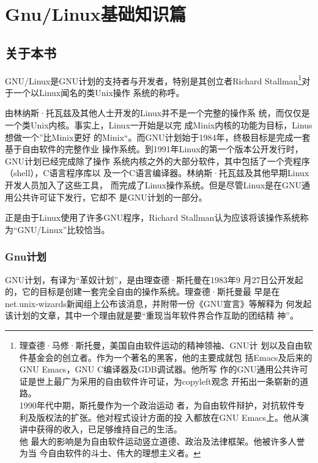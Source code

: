\part{Gnu/Linux基础知识篇}
\label{part1}

\chapter{关于本书}
\label{part1:chap1}

GNU/Linux是GNU计划的支持者与开发者，特别是其创立者Richard
Stallman\footnote{理查德·马修·斯托曼，美国自由软件运动的精神领袖、GNU计
  划以及自由软件基金会的创立者。作为一个著名的黑客，他的主要成就包
  括Emacs及后来的GNU Emacs，GNU C编译器及GDB调试器。他所写
  作的GNU通用公共许可证是世上最广为采用的自由软件许可证，为copyleft观念
  开拓出一条崭新的道路。\\ \indent1990年代中期，斯托曼作为一个政治运动
  者，为自由软件辩护，对抗软件专利及版权法的扩张。他对程式设计方面的投
  入都放在GNU Emacs上。他从演讲中获得的收入，已足够维持自己的生活。\\他
  最大的影响是为自由软件运动竖立道德、政治及法律框架。他被许多人誉为当
  今自由软件的斗士、伟大的理想主义者。}对于一个以Linux闻名的类Unix操作
系统的称呼。

由林纳斯·托瓦兹及其他人士开发的Linux并不是一个完整的操作系
统，而仅仅是一个类Unix内核。事实上，Linux一开始是以完
成Minix内核的功能为目标，Linus想做一个”比Minix更好
的Minix“。而GNU计划始于1984年，终极目标是完成一套基于自由软件的完整作业
操作系统。到1991年Linux的第一个版本公开发行时，GNU计划已经完成除了操作
系统内核之外的大部分软件，其中包括了一个壳程序（shell），C语言程序库以
及一个C语言编译器。林纳斯·托瓦兹及其他早期Linux开发人员加入了这些工具，
而完成了Linux操作系统。但是尽管Linux是在GNU通用公共许可证下发行，它却不
是GNU计划的一部分。

正是由于Linux使用了许多GNU程序，Richard Stallman认为应该将该操作系统称
为“GNU/Linux”比较恰当。\cite{baike}

\section{Gnu计划}
\label{part1:chap1:sec:gnuPlan}

GNU计划，有译为“革奴计划”，是由理查德·斯托曼在1983年9
月27日公开发起的，它的目标是创建一套完全自由的操作系统。理查德·斯托曼最
早是在net.unix-wizards新闻组上公布该消息，并附带一份《GNU宣言》等解释为
何发起该计划的文章，其中一个理由就是要“重现当年软件界合作互助的团结精
神”。

